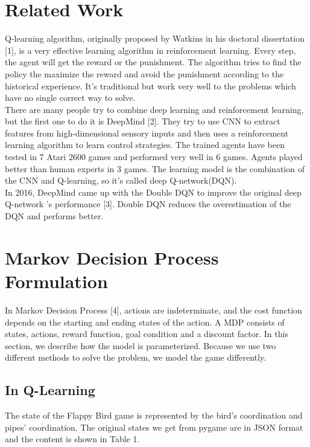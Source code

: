 \documentclass[conference,compsoc]{IEEEtran}
\begin{document}
\section{Related Work}
Q-learning algorithm, originally proposed by Watkins in his doctoral dissertation [1], is a very effective learning algorithm in reinforcement learning. Every step, the agent will get the reward or the punishment. The algorithm tries to find the policy the maximize the reward and avoid the punishment according to the historical experience. It’s traditional but work very well to the problems which have no single correct way to solve.
\\
\indent 
There are many people try to combine deep learning and reinforcement learning, but the first one to do it is DeepMind [2]. They try to use CNN to extract features from high-dimensional sensory inputs and then uses a reinforcement learning algorithm to learn control strategies. The trained agents have been tested in 7 Atari 2600 games and performed very well in 6 games. Agents played better than human experts in 3 games. The learning model is the combination of the CNN and Q-learning, so it’s called deep Q-network(DQN).
\\
\indent 
In 2016, DeepMind came up with the Double DQN to improve the original deep Q-network ’s performance [3]. Double DQN reduces the overestimation of the DQN and performs better.

\section{Markov Decision Process Formulation}
In Markov Decision Process [4], actions are indeterminate, and the cost function depends on the starting and ending states of the action. A MDP consists of states, actions, reward function, goal condition and a discount factor. In this section, we describe how the model is parameterized. Because we use two different methods to solve the problem, we model the game differently.

\subsection{In Q-Learning}
The state of the Flappy Bird game is represented by the bird’s coordination and pipes’ coordination. The original states we get from pygame are in JSON format and the content is shown in Table 1.
\end{document}
